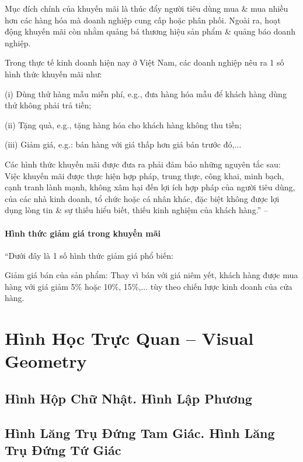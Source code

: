 \documentclass[oneside]{book}
\numberwithin{equation}{section}
\begin{document}
Mục đích chính của khuyến mãi là thúc đẩy người tiêu dùng mua \& mua nhiều hơn các hàng hóa mà doanh nghiệp cung cấp hoặc phân phối. Ngoài ra, hoạt động khuyến mãi còn nhằm quảng bá thương hiệu sản phẩm \& quảng báo doanh nghiệp.

Trong thực tế kinh doanh hiện nay ở Việt Nam, các doanh nghiệp nêu ra 1 số hình thức khuyến mãi như:
\begin{enumerate*}
	\item[(i)] Dùng thử hàng mẫu miễn phí, e.g., đưa hàng hóa mẫu để khách hàng dùng thử không phải trả tiền;
	\item[(ii)] Tặng quà, e.g., tặng hàng hóa cho khách hàng không thu tiền;
	\item[(iii)] Giảm giá, e.g.: bán hàng với giá thấp hơn giá bán trước đó,$\ldots$
\end{enumerate*}
Các hình thức khuyến mãi được đưa ra phải đảm bảo những nguyên tắc sau: Việc khuyến mãi được thực hiện hợp pháp, trung thực, công khai, minh bạch, cạnh tranh lành mạnh, không xâm hại đến lợi ích hợp pháp của người tiêu dùng, của các nhà kinh doanh, tổ chức hoặc cá nhân khác, đặc biệt không được lợi dụng lòng tin \& sự thiếu hiểu biết, thiếu kinh nghiệm của khách hàng.'' -- \cite[p. 71]{SGK_Toan_7_Canh_Dieu_tap_1}

\subsubsection{Hình thức giảm giá trong khuyến mãi}
``Dưới đây là 1 số hình thức giảm giá phổ biến:
\begin{enumerate*}
	\item Giảm giá bán của sản phẩm: Thay vì bán với giá niêm yết, khách hàng được mua hàng với giá giảm 5\% hoặc 10\%, 15\%,$\ldots$ tùy theo chiến lược kinh doanh của cửa hàng.
\end{enumerate*}


\chapter{Hình Học Trực Quan -- Visual Geometry}

\section{Hình Hộp Chữ Nhật. Hình Lập Phương}

\section{Hình Lăng Trụ Đứng Tam Giác. Hình Lăng Trụ Đứng Tứ Giác}
\end{document}
